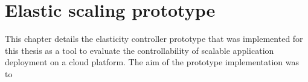 \documentclass[english]{tktltiki2}
\theoremstyle{definition}
\theoremstyle{remark}
\begin{document}












%
%
%
%
%

\section{Elastic scaling prototype}
\label{sec:elasticScalingPrototype}

This chapter details the elasticity controller prototype that was implemented
for this thesis as a tool to evaluate the controllability of scalable
application deployment on a cloud platform. The aim of the prototype
implementation was to
\end{document}

